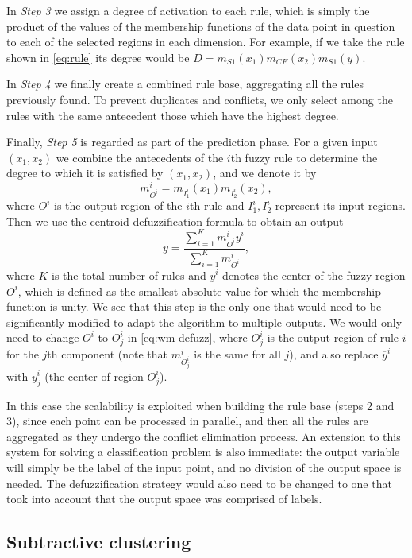 In \textit{Step 3} we assign a degree of activation to each rule, which is simply the product of the values of the membership functions of the data point in question to each of the selected regions in each dimension. For example, if we take the rule shown in \eqref{eq:rule} its degree would be $D=m_{S1}(x_1)m_{CE}(x_2)m_{S1}(y)$.

In \textit{Step 4} we finally create a combined rule base, aggregating all the rules previously found. To prevent duplicates and conflicts, we only select among the rules with the same antecedent those which have the highest degree.

Finally, \textit{Step 5} is regarded as part of the prediction phase. For a given input $(x_1,x_2)$ we combine the antecedents of the $i$th fuzzy rule to determine the degree to which it is satisfied by $(x_1,x_2)$, and we denote it by
\[
m^i_{O^i} = m_{I_1^i}(x_1)m_{I_2^i}(x_2),
\]
where $O^i$ is the output region of the $i$th rule and $I_1^i, I_2^i$ represent its input regions. Then we use the centroid defuzzification formula to obtain an output
\begin{equation}\label{eq:wm-defuzz}
  y = \dfrac{\displaystyle \sum_{i=1}^K m^i_{O^i}\overbar{y}^i}{\displaystyle \sum_{i=1}^K m^i_{O^i}},
\end{equation}
where $K$ is the total number of rules and $\overbar{y}^i$ denotes the center of the fuzzy region $O^i$, which is defined as the smallest absolute value for which the membership function is unity. We see that this step is the only one that would need to be significantly modified to adapt the algorithm to multiple outputs. We would only need to change $O^i$ to $O^{i}_j$ in \eqref{eq:wm-defuzz}, where $O^{i}_j$ is the output region of rule $i$ for the $j$th component (note that $m^i_{O^i_j}$ is the same for all $j$), and also replace $\overbar{y}^i$ with $\overbar{y}^i_j$ (the center of region $O_j^{i}$).

In this case the scalability is exploited when building the rule base (steps 2 and 3), since each point can be processed in parallel, and then all the rules are aggregated as they undergo the conflict elimination process. An extension to this system for solving a classification problem is also immediate: the output variable will simply be the label of the input point, and no division of the output space is needed. The defuzzification strategy would also need to be changed to one that took into account that the output space was comprised of labels.

\subsection{Subtractive clustering}

